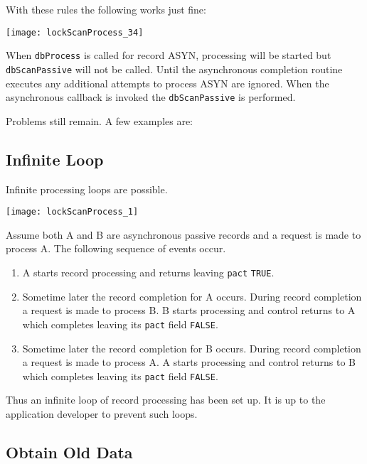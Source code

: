 With these rules the following works just fine:

\begin{center}
\texttt{[image: lockScanProcess\_34]}
\end{center}

When \verb|dbProcess| is called for record ASYN, processing will be started but \verb|dbScanPassive| will not be called. Until 
the asynchronous completion routine executes any additional attempts to process ASYN are ignored. When the 
asynchronous callback is invoked the \verb|dbScanPassive| is performed.

Problems still remain. A few examples are:

\subsection{Infinite Loop}

Infinite processing loops are possible.

\begin{center}
\texttt{[image: lockScanProcess\_1]}
\end{center}

Assume both A and B are asynchronous passive records and a request is made to process A. The following sequence of 
events occur.

\begin{enumerate}
\item A starts record processing and returns leaving \verb|pact| \verb|TRUE|.

\item Sometime later the record completion for A occurs. During record completion a request is made to process B. B 
starts processing and control returns to A which completes leaving its \verb|pact| field \verb|FALSE|.

\item Sometime later the record completion for B occurs. During record completion a request is made to process A. A 
starts processing and control returns to B which completes leaving its \verb|pact| field \verb|FALSE|.

\end{enumerate}

Thus an infinite loop of record processing has been set up. It is up to the application developer to prevent such loops.

\subsection{Obtain Old Data}

